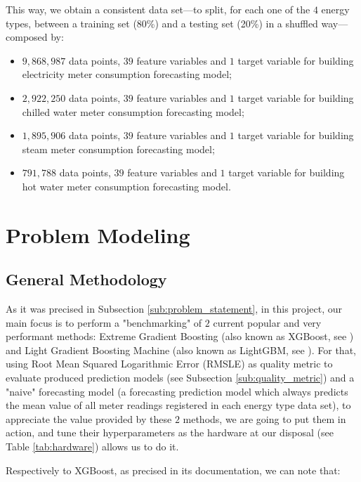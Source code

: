 \documentclass[twocolumn, switch]{article}
\begin{document}
This way, we obtain a consistent data set---to split, for each one of the $4$ energy types, between a training set (80\%) and a testing set (20\%) in a shuffled way---composed by:

\begin{itemize}
\item $9,868,987$ data points, $39$ feature variables and $1$ target variable for building electricity meter consumption forecasting model;
\item $2,922,250$ data points, $39$ feature variables and $1$ target variable for building chilled water meter consumption forecasting model;
\item $1,895,906$ data points, $39$ feature variables and $1$ target variable for building steam meter consumption forecasting model;
\item $791,788$ data points, $39$ feature variables and $1$ target variable for building hot water meter consumption forecasting model.
\end{itemize}


\section{Problem Modeling}

\subsection{General Methodology}

As it was precised in Subsection \ref{sub:problem_statement}, in this project, our main focus is to perform a "benchmarking" of $2$ current popular and very performant methods: Extreme Gradient Boosting (also known as XGBoost, see \cite{Chen_2016}) and Light Gradient Boosting Machine (also known as LightGBM, see \cite{Ke_2017}). For that, using Root Mean Squared Logarithmic Error (RMSLE) as quality metric to evaluate produced prediction models (see Subsection \ref{sub:quality_metric}) and a "naive" forecasting model (a forecasting prediction model which always predicts the mean value of all meter readings registered in each energy type data set), to appreciate the value provided by these $2$ methods, we are going to put them in action, and tune their hyperparameters as the hardware at our disposal (see Table \ref{tab:hardware}) allows us to do it.

Respectively to XGBoost, as precised in its documentation, we can note that:
\end{document}
